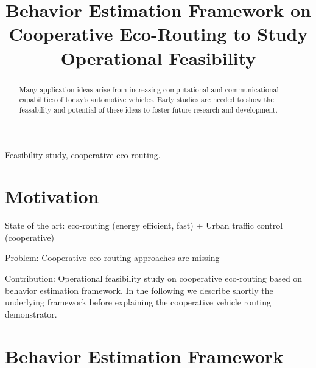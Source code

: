 \documentclass[conference]{../cls/IEEEtran}
\begin{document}
\title{Behavior Estimation Framework on Cooperative Eco-Routing to Study Operational Feasibility}

\author{
	\and
}

\maketitle

\begin{abstract}
Many application ideas arise from increasing computational and communicational capabilities of today's automotive vehicles.
Early studies are needed to show the feasability and potential of these ideas to foster future research and development.
\end{abstract}

\begin{IEEEkeywords}
Feasibility study, cooperative eco-routing.
\end{IEEEkeywords}

\section{Motivation}

State of the art: eco-routing (energy efficient, fast) + Urban traffic control (cooperative)

Problem: Cooperative eco-routing approaches are missing

Contribution: Operational feasibility study on cooperative eco-routing based on behavior estimation framework.
In the following we describe shortly the underlying framework before explaining the cooperative vehicle routing demonstrator.

\section{Behavior Estimation Framework}
\end{document}
